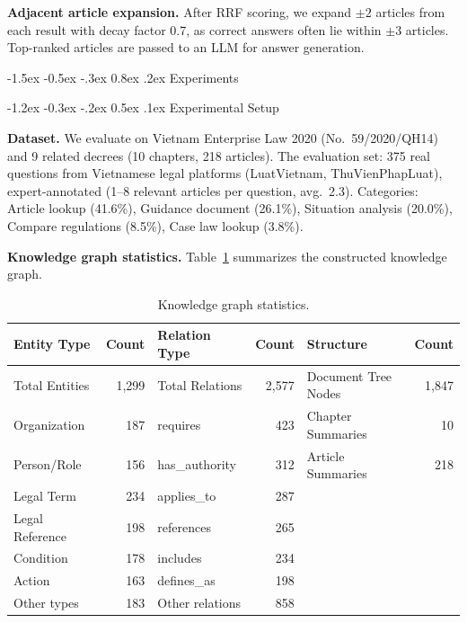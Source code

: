 \documentclass{IOS-Book-Article}
\makeatletter
\renewcommand\section{\@startsection{section}{1}{\z@}%
  {-1.5ex \@plus -0.5ex \@minus -.3ex}%
  {0.8ex \@plus .2ex}%
  {\normalfont\large\bfseries}}
\renewcommand\subsection{\@startsection{subsection}{2}{\z@}%
  {-1.2ex \@plus -0.3ex \@minus -.2ex}%
  {0.5ex \@plus .1ex}%
  {\normalfont\normalsize\bfseries}}
\makeatother
\begin{document}
\textbf{Adjacent article expansion.} After RRF scoring, we expand $\pm 2$ articles from each result with decay factor 0.7, as correct answers often lie within $\pm 3$ articles. Top-ranked articles are passed to an LLM for answer generation.

\section{Experiments}
\label{sec:experiments}

\subsection{Experimental Setup}

\textbf{Dataset.} We evaluate on Vietnam Enterprise Law 2020 (No.~59/2020/QH14) and 9 related decrees (10 chapters, 218 articles). The evaluation set: 375 real questions from Vietnamese legal platforms (LuatVietnam, ThuVienPhapLuat), expert-annotated (1--8 relevant articles per question, avg.\ 2.3). Categories: Article lookup (41.6\%), Guidance document (26.1\%), Situation analysis (20.0\%), Compare regulations (8.5\%), Case law lookup (3.8\%).

\textbf{Knowledge graph statistics.} Table~\ref{tab:kg-stats} summarizes the constructed knowledge graph.

\begin{table}[H]
\centering\footnotesize
\caption{Knowledge graph statistics.}
\label{tab:kg-stats}
\begin{tabular}{lr@{\hskip 1.2cm}lr@{\hskip 1.2cm}lr}
\toprule
\textbf{Entity Type} & \textbf{Count} & \textbf{Relation Type} & \textbf{Count} & \textbf{Structure} & \textbf{Count} \\
\midrule
Total Entities & 1,299 & Total Relations & 2,577 & Document Tree Nodes & 1,847 \\
Organization & 187 & requires & 423 & Chapter Summaries & 10 \\
Person/Role & 156 & has\_authority & 312 & Article Summaries & 218 \\
Legal Term & 234 & applies\_to & 287 & & \\
Legal Reference & 198 & references & 265 & & \\
Condition & 178 & includes & 234 & & \\
Action & 163 & defines\_as & 198 & & \\
Other types & 183 & Other relations & 858 & & \\
\bottomrule
\end{tabular}
\end{table}
\end{document}
